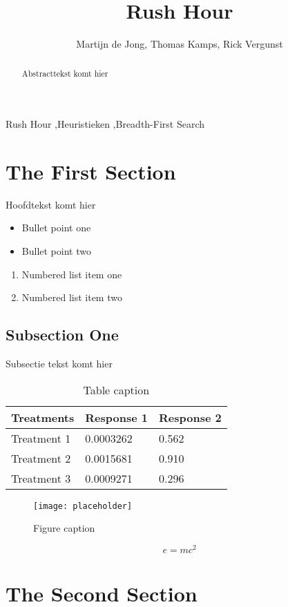 \documentclass[preprint,12pt]{elsarticle}
\begin{document}
\begin{frontmatter}


\title{Rush Hour}
\author{Martijn de Jong, Thomas Kamps, Rick Vergunst}

\begin{abstract}
Abstracttekst komt hier
\end{abstract}

\begin{keyword}
Rush Hour \sep Heuristieken \sep Breadth-First Search
\end{keyword}

\end{frontmatter}


\section{The First Section}
\label{S:1}
Hoofdtekst komt hier

\begin{itemize}
\item Bullet point one
\item Bullet point two
\end{itemize}

\begin{enumerate}
\item Numbered list item one
\item Numbered list item two
\end{enumerate}

\subsection{Subsection One}
Subsectie tekst komt hier

\begin{table}[h]
\centering
\begin{tabular}{l l l}
\hline
\textbf{Treatments} & \textbf{Response 1} & \textbf{Response 2}\\
\hline
Treatment 1 & 0.0003262 & 0.562 \\
Treatment 2 & 0.0015681 & 0.910 \\
Treatment 3 & 0.0009271 & 0.296 \\
\hline
\end{tabular}
\caption{Table caption}
\end{table}

\begin{figure}[h]
\centering\texttt{[image: placeholder]}
\caption{Figure caption}
\end{figure}

\begin{equation}
\label{eq:emc}
e = mc^2
\end{equation}

\section{The Second Section}
\label{S:2}
\end{document}

